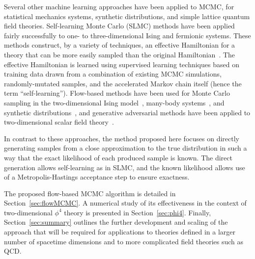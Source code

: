 Several other machine learning approaches have been applied to MCMC, for statistical mechanics systems, synthetic distributions, and simple lattice quantum field theories. Self-learning Monte Carlo (SLMC) methods have been applied fairly successfully to one- to three-dimensional Ising and fermionic systems. These methods construct, by a variety of techniques, an effective Hamiltonian for a theory that can be more easily sampled than the original Hamiltonian~\cite{Huang2017,Liu2017SLMC,Liu2016SLMCFermion, Nagai2017SLMCCT,Shen2018SLMCDNN}.
The effective Hamiltonian is learned using supervised learning techniques based on training data drawn from a combination of existing MCMC simulations, randomly-mutated samples, and the accelerated Markov chain itself (hence the term ``self-learning'').
Flow-based methods have been used for Monte Carlo sampling in the two-dimensional Ising model~\cite{Li2018}, many-body systems~\cite{NoeBoltzmannGenerators2018}, and
synthetic distributions~\cite{Song2017,Levy2017GenHMC}, and generative adversarial methods have been applied to two-dimensional scalar field theory~\cite{Urban2018,Zhou2018}.

In contrast to these approaches, the method proposed here focuses on directly generating samples from a close approximation to the true distribution in such a way that the exact likelihood of each produced sample is known. The direct generation allows self-learning as in SLMC, and the known likelihood allows use of a Metropolis-Hastings acceptance step to ensure exactness.


The proposed flow-based MCMC algorithm is detailed in Section~\ref{sec:flowMCMC}. A numerical study of its effectiveness in the context of two-dimensional $\phi^4$ theory is presented in Section~\ref{sec:phi4}. Finally, Section~\ref{sec:summary} outlines the further development and scaling of the approach that will be required for applications to theories defined in a larger number of spacetime dimensions and to more complicated field theories such as QCD.
